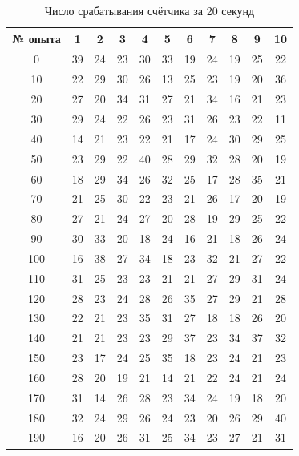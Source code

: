 \begin{table}
    \centering
    \caption{Число срабатывания счётчика за 20 секунд}
    \begin{tabular}{|c|c|c|c|c|c|c|c|c|c|c|}
    \hline
        № опыта & 1 & 2 & 3 & 4 & 5 & 6 & 7 & 8 & 9 & 10 \\ \hline
        0 & 39 & 24 & 23 & 30 & 33 & 19 & 24 & 19 & 25 & 22 \\ \hline
        10 & 22 & 29 & 30 & 26 & 13 & 25 & 23 & 19 & 20 & 36 \\ \hline
        20 & 27 & 20 & 34 & 31 & 27 & 21 & 34 & 16 & 21 & 23 \\ \hline
        30 & 29 & 24 & 22 & 26 & 23 & 31 & 26 & 23 & 22 & 11 \\ \hline
        40 & 14 & 21 & 23 & 22 & 21 & 17 & 24 & 30 & 29 & 25 \\ \hline
        50 & 23 & 29 & 22 & 40 & 28 & 29 & 32 & 28 & 20 & 19 \\ \hline
        60 & 18 & 29 & 34 & 26 & 32 & 25 & 17 & 28 & 35 & 21 \\ \hline
        70 & 21 & 25 & 30 & 22 & 23 & 21 & 26 & 17 & 20 & 19 \\ \hline
        80 & 27 & 21 & 24 & 27 & 20 & 28 & 19 & 29 & 25 & 22 \\ \hline
        90 & 30 & 33 & 20 & 18 & 24 & 16 & 21 & 18 & 26 & 24 \\ \hline
        100 & 16 & 38 & 27 & 34 & 18 & 23 & 32 & 21 & 27 & 22 \\ \hline
        110 & 31 & 25 & 23 & 23 & 21 & 21 & 27 & 29 & 31 & 24 \\ \hline
        120 & 28 & 23 & 24 & 28 & 26 & 35 & 27 & 29 & 21 & 28 \\ \hline
        130 & 22 & 21 & 23 & 35 & 31 & 27 & 18 & 18 & 26 & 20 \\ \hline
        140 & 21 & 21 & 23 & 23 & 29 & 37 & 23 & 34 & 37 & 32 \\ \hline
        150 & 23 & 17 & 24 & 25 & 35 & 18 & 23 & 24 & 21 & 23 \\ \hline
        160 & 28 & 20 & 19 & 21 & 14 & 21 & 22 & 24 & 21 & 24 \\ \hline
        170 & 31 & 14 & 26 & 28 & 23 & 34 & 24 & 19 & 18 & 20 \\ \hline
        180 & 32 & 24 & 29 & 26 & 24 & 23 & 20 & 26 & 29 & 40 \\ \hline
        190 & 16 & 20 & 26 & 31 & 25 & 34 & 23 & 27 & 21 & 31 \\ \hline
    \end{tabular}
    \label{table:1}
\end{table}

